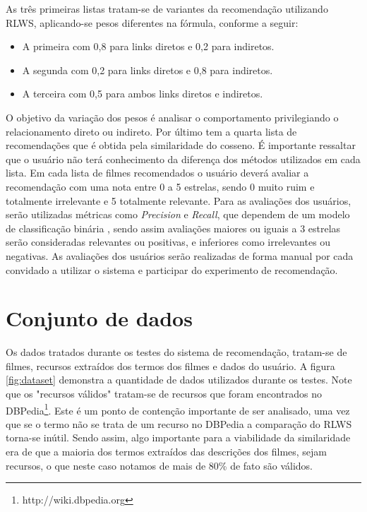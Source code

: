 As três primeiras listas tratam-se de variantes da recomendação utilizando \ac{RLWS}, aplicando-se pesos diferentes na fórmula, conforme a seguir: 

\begin{itemize}
	\item{A primeira com 0,8 para links diretos e 0,2 para indiretos.}
	\item{A segunda com 0,2 para links diretos e 0,8 para indiretos.}
	\item{A terceira com 0,5 para ambos links diretos e indiretos.}
\end{itemize}

O objetivo da variação dos pesos é analisar o comportamento privilegiando o relacionamento direto ou indireto. Por último tem a quarta lista de recomendações que é obtida pela similaridade do cosseno. É importante ressaltar que o usuário não terá conhecimento da diferença dos métodos utilizados em cada lista. Em cada lista de filmes recomendados o usuário deverá avaliar a recomendação com uma nota entre 0 a 5 estrelas, sendo 0 muito ruim e totalmente irrelevante e 5 totalmente relevante. Para as avaliações dos usuários, serão utilizadas métricas como \textit{Precision} e \textit{Recall}, que dependem de um modelo de classificação binária \citep{Powers_2008}, sendo assim avaliações maiores ou iguais a 3 estrelas serão consideradas relevantes ou positivas, e inferiores como irrelevantes ou negativas. As avaliações dos usuários serão realizadas de forma manual por cada convidado a utilizar o sistema e participar do experimento de recomendação.

\section{Conjunto de dados}

Os dados tratados durante os testes do sistema de recomendação, tratam-se de filmes, recursos extraídos dos termos dos filmes e dados do usuário. A figura \ref{fig:dataset} demonstra a quantidade de dados utilizados durante os testes. Note que os "recursos válidos" tratam-se de recursos que foram encontrados no DBPedia\footnote{http://wiki.dbpedia.org}. Este é um ponto de contenção importante de ser analisado, uma vez que se o termo não se trata de um recurso no DBPedia a comparação do \ac{RLWS} torna-se inútil. Sendo assim, algo importante para a viabilidade da similaridade era de que a maioria dos termos extraídos das descrições dos filmes, sejam recursos, o que neste caso notamos de mais de 80\% de fato são válidos.

